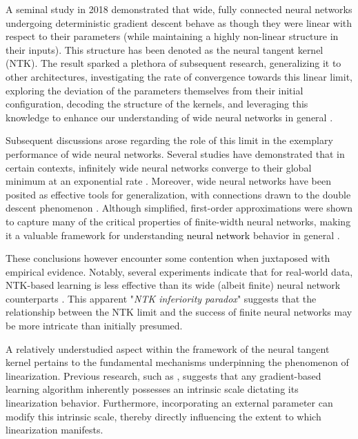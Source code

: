 \documentclass{article} %
\begin{document}
A seminal study in 2018 \cite{ConvergenceOverparameterization2019} demonstrated that wide, fully connected neural networks undergoing deterministic gradient descent behave as though they were linear with respect to their parameters (while maintaining a highly non-linear structure in their inputs). This structure has been denoted as the neural tangent kernel (NTK). The result sparked a plethora of subsequent research, generalizing it to other architectures, investigating the rate of convergence towards this linear limit, exploring the deviation of the parameters themselves from their initial configuration, decoding the structure of the kernels, and leveraging this knowledge to enhance our understanding of wide neural networks in general \cite{WideNNEvLinGD2019,OnExactWideNN2019,GeneralizationBounds2019,PhysicsInformedML2021,PowerOfDataQuanML2021,DeeplearningStat2021,KernelRichRegimes2020}.

Subsequent discussions arose regarding the role of this limit in the exemplary performance of wide neural networks. Several studies have demonstrated that in certain contexts, infinitely wide neural networks converge to their global minimum at an exponential rate \cite{ConvergenceOverparameterization2019,WideNNEvLinGD2019,GradientDescentfindsGlobal2019,LearningAndGeneralization2019,AConvergenceOverPar2019,sgd2017daniely,Learningoverparameterized2018,Gradientdescentprovably2018,HowNNExtrapolate2020}. Moreover, wide neural networks have been posited as effective tools for generalization, with connections drawn to the double descent phenomenon \cite{Belkin2019,DeepDoubleDescent2021,TheGeneralizationError2022}. Although simplified, first-order approximations were shown to capture many of the critical properties of finite-width neural networks, making it a valuable framework for understanding \textcolor{black}{neural network} behavior in general \cite{OnExactWideNN2019,OnRandomKernels2021,FeatureInWide2020}.

These conclusions however encounter some contention when juxtaposed with empirical evidence. Notably, several experiments indicate that for real-world data, NTK-based learning is less effective than its wide (albeit finite) neural network counterparts \cite{FiniteVersusInfinite2020,DeepVsKernelEmp2020}. This apparent "\textit{NTK inferiority paradox}" suggests that the relationship between the NTK limit and the success of finite neural networks may be more intricate than initially presumed.

A relatively understudied aspect within the framework of the neural tangent kernel pertains to the fundamental mechanisms underpinning the phenomenon of linearization. Previous research, such as \cite{OnLazyTraining2019}, suggests that any gradient-based learning algorithm inherently possesses an intrinsic scale dictating its linearization behavior. Furthermore, incorporating an external parameter can modify this intrinsic scale, thereby directly influencing the extent to which linearization manifests. 
\end{document}
